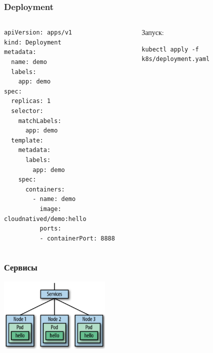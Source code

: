 \documentclass{../../slides-style}
\begin{document}
    \begin{frame}[fragile]
        \frametitle{Deployment}
        \begin{columns}
            \begin{column}{0.5\textwidth}
                \begin{scriptsize}
                    \begin{verbatim}
apiVersion: apps/v1
kind: Deployment
metadata:
  name: demo
  labels:
    app: demo
spec:
  replicas: 1
  selector:
    matchLabels:
      app: demo
  template:
    metadata:
      labels:
        app: demo
    spec:
      containers:
        - name: demo
          image: cloudnatived/demo:hello
          ports:
          - containerPort: 8888
                    \end{verbatim}
                \end{scriptsize}
            \end{column}
            \begin{column}{0.5\textwidth}
                Запуск:
                \begin{verbatim}
kubectl apply -f k8s/deployment.yaml
                \end{verbatim}
            \end{column}
        \end{columns}
    \end{frame}

    \begin{frame}
        \frametitle{Сервисы}
        \begin{center}
            \includegraphics[width=0.4\textwidth]{kubernetesServices.png}
        \end{center}
    \end{frame}
\end{document}
